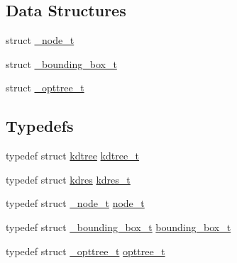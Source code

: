 \subsection*{\-Data \-Structures}
\begin{DoxyCompactItemize}
\item 
struct \hyperlink{a00003}{\-\_\-node\-\_\-t}
\item 
struct \hyperlink{a00001}{\-\_\-bounding\-\_\-box\-\_\-t}
\item 
struct \hyperlink{a00005}{\-\_\-opttree\-\_\-t}
\end{DoxyCompactItemize}
\subsection*{\-Typedefs}
\begin{DoxyCompactItemize}
\item 
typedef struct \hyperlink{a00011}{kdtree} \hyperlink{a00020_a3f2e3c0cbfdc70b2db1a09b9aa637a63_a3f2e3c0cbfdc70b2db1a09b9aa637a63}{kdtree\-\_\-t}
\item 
typedef struct \hyperlink{a00010}{kdres} \hyperlink{a00020_a7aa4cf85254d52d13693c7328834f6c5_a7aa4cf85254d52d13693c7328834f6c5}{kdres\-\_\-t}
\item 
typedef struct \hyperlink{a00003}{\-\_\-node\-\_\-t} \hyperlink{a00020_a9c3f304c1ae0687240efd69b7dc98cd6_a9c3f304c1ae0687240efd69b7dc98cd6}{node\-\_\-t}
\item 
typedef struct \hyperlink{a00001}{\-\_\-bounding\-\_\-box\-\_\-t} \hyperlink{a00020_a8cc4dbdff0bcdec2142e75a68b717e6c_a8cc4dbdff0bcdec2142e75a68b717e6c}{bounding\-\_\-box\-\_\-t}
\item 
typedef struct \hyperlink{a00005}{\-\_\-opttree\-\_\-t} \hyperlink{a00020_a07b75293fafb6f31b7e9f723848ad105_a07b75293fafb6f31b7e9f723848ad105}{opttree\-\_\-t}
\end{DoxyCompactItemize}

